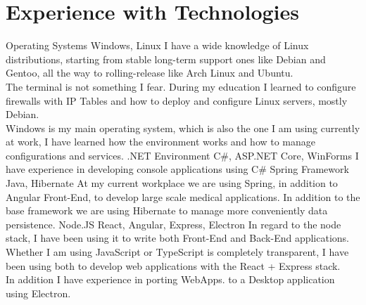 \section*{Experience with Technologies}
\tech
  {Operating Systems}
  {Windows, Linux}
  {I have a wide knowledge of Linux distributions, starting from stable long-term support ones like Debian and Gentoo, all the way to rolling-release like Arch Linux and Ubuntu.\\
  The terminal is not something I fear. During my education I learned to configure firewalls with IP Tables and how to deploy and configure Linux servers, mostly Debian.\\
  Windows is my main operating system, which is also the one I am using currently at work, I have learned how the environment works and how to manage configurations and services.}
\tech
  {.NET Environment}
  {C\#, ASP.NET Core, WinForms}
  {I have experience in developing console applications using C\#}
\tech
  {Spring Framework}
  {Java, Hibernate}
  {At my current workplace we are using Spring, in addition to Angular Front-End, to develop large scale medical applications. In addition to the base framework we are using Hibernate to manage more conveniently data persistence.}
\tech
  {Node.JS}
  {React, Angular, Express, Electron}
  {In regard to the node stack, I have been using it to write both Front-End and Back-End applications. Whether I am using JavaScript or TypeScript is completely transparent, I have been using both to develop web applications with the React + Express stack.\\
  In addition I have experience in porting WebApps. to a Desktop application using Electron.}
